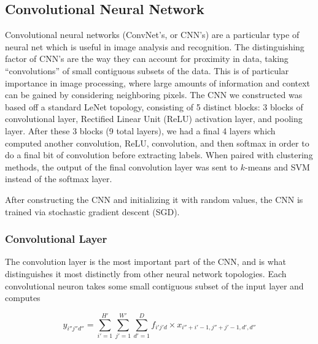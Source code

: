 \documentclass[11pt]{article}
\begin{document}
\subsection{Convolutional Neural Network}
Convolutional neural networks (ConvNet's, or CNN's) are a particular type of neural net which is useful in image analysis and recognition. The distinguishing factor of CNN's are the way they can account for proximity in data, taking ``convolutions'' of small contiguous subsets of the data. This is of particular importance in image processing, where large amounts of information and context can be gained by considering neighboring pixels. The CNN we constructed was based off a standard LeNet topology, consisting of 5 distinct blocks: 3 blocks of convolutional layer, Rectified Linear Unit (ReLU) activation layer, and pooling layer. After these 3 blocks (9 total layers), we had a final 4 layers which computed another convolution, ReLU, convolution, and then softmax in order to do a final bit of convolution before extracting labels. When paired with clustering methods, the output of the final convolution layer was sent to $k$-means and SVM instead of the softmax layer.

After constructing the CNN and initializing it with random values, the CNN is trained via stochastic gradient descent (SGD).

\subsubsection{Convolutional Layer}
The convolution layer is the most important part of the CNN, and is what distinguishes it most distinctly from other neural network topologies. Each convolutional neuron takes some small contiguous subset of the input layer and computes

\[ y_{i''j''d''} = \sum_{i'=1}^{H'}\sum_{j'=1}^{W'}\sum_{d'=1}^{D} f_{i'j'd} \times x_{i''+i'-1,j''+j'-1,d',d''} \]
\end{document}
